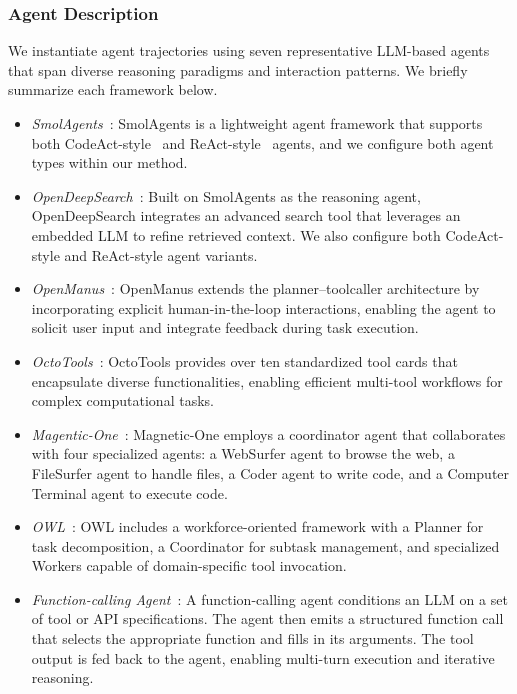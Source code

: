 \subsubsection{Agent Description}
\label{appendix_agent_descrip}
We instantiate agent trajectories using seven representative LLM-based agents that span diverse reasoning paradigms and interaction patterns. We briefly summarize each framework below.
\begin{itemize}[noitemsep,left=2pt, itemsep=0pt, topsep=0pt]
    \item \textit{SmolAgents}~\cite{roucher2025smolagents}: SmolAgents is a lightweight agent framework that supports both CodeAct-style~\cite{wang2024executable} and ReAct-style~\cite{yao2022react} agents, and we configure both agent types within our method.
    \item \textit{OpenDeepSearch}~\cite{alzubi2025open}: Built on SmolAgents as the reasoning agent, OpenDeepSearch integrates an advanced search tool that leverages an embedded LLM to refine retrieved context. We also configure both CodeAct-style and ReAct-style agent variants.
    \item \textit{OpenManus}~\cite{openmanus2025}: OpenManus extends the planner–toolcaller architecture by incorporating explicit human-in-the-loop interactions, enabling the agent to solicit user input and integrate feedback during task execution.
    \item \textit{OctoTools}~\cite{lu2025octotools}: OctoTools provides over ten standardized tool cards that encapsulate diverse functionalities, enabling efficient multi-tool workflows for complex computational tasks.
    \item \textit{Magentic-One}~\cite{fourney2024magentic}: Magnetic-One employs a coordinator agent that collaborates with four specialized agents: a WebSurfer agent to browse the web, a FileSurfer agent to handle files, a Coder agent to write code, and a Computer Terminal agent to execute code.
    \item \textit{OWL}~\cite{hu2025owl}: OWL includes a workforce-oriented framework with a Planner for task decomposition, a Coordinator for subtask management, and specialized Workers capable of domain-specific tool invocation.
    \item \textit{Function-calling Agent}~\cite{patilberkeley}: A function-calling agent conditions an LLM on a set of tool or API specifications. The agent then emits a structured function call that selects the appropriate function and fills in its arguments. The tool output is fed back to the agent, enabling multi-turn execution and iterative reasoning.
\end{itemize}

